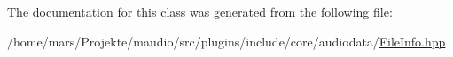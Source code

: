 The documentation for this class was generated from the following file\-:\begin{DoxyCompactItemize}
\item 
/home/mars/\-Projekte/maudio/src/plugins/include/core/audiodata/\hyperlink{FileInfo_8hpp}{File\-Info.\-hpp}\end{DoxyCompactItemize}
